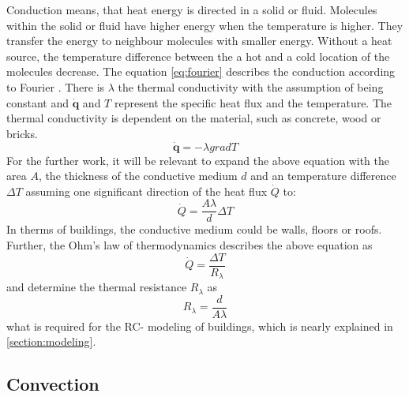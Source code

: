     Conduction means, that heat energy is directed in a solid or fluid. Molecules within the solid or fluid have higher energy when the temperature is higher. They transfer the energy to neighbour molecules with smaller energy. Without a heat source, the temperature difference between the a hot and a cold location of the molecules decrease.\cite{Kuchling.2007}
    \newline The equation \ref{eq:fourier} describes the conduction according to Fourier \cite{.2013}. There is $\lambda$ the thermal conductivity with the assumption of being constant and $\dot{\textbf{q}}$ and $T$ represent the specific heat flux and the temperature. The thermal conductivity is dependent on the material, such as concrete, wood or bricks. 
    \begin{equation}
    \label{eq:fourier}
        \dot{\textbf{q}} = - \lambda grad T
    \end{equation}
    For the further work, it will be relevant to expand the above equation with the area $A$, the thickness of the conductive medium $d$ and an temperature difference $\Delta T$ assuming one significant direction of the heat flux $\dot{Q}$ to:
    \begin{equation}
    \label{eq:conduction}
        \dot{Q} = \frac{A\lambda}{d} \Delta T
    \end{equation}
    In therms of buildings, the conductive medium could be walls, floors or roofs.
    \newline
    Further, the Ohm's law of thermodynamics describes the above equation as 
     \begin{equation}
    \label{eq:conduction}
        \dot{Q} = \frac{\Delta T}{R_\lambda} 
    \end{equation}
    and determine the thermal resistance $R_\lambda$ as
    \cite{Kuchling.2007}
    \begin{equation}
    \label{eq:r_lambda}
        R_\lambda = \frac{d}{A\lambda}
    \end{equation}
    what is required for the RC- modeling of buildings, which is nearly explained in \ref{section:modeling}.

\subsection{Convection}
\label{subsection:convection}

